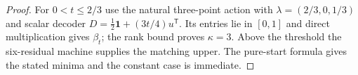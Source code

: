 \begin{proof}
For $0<t\le2/3$ use the natural three-point action with
$\lambda=(2/3,0,1/3)$ and scalar decoder
$D=\tfrac12\mathbf1+(3t/4)u^{\mathsf T}$. Its entries lie in $[0,1]$
and direct multiplication gives $\beta_t$; the rank bound proves
$\kappa=3$. Above the threshold the six-residual machine supplies the
matching upper. The pure-start formula gives the stated minima and the
constant case is immediate.
\end{proof}
